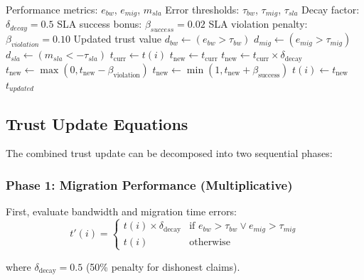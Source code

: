 \documentclass[12pt,a4paper]{article}
\begin{document}
\begin{algorithm}[H]
\caption{Combined Trust Evaluation}
\begin{algorithmic}[1]
\Require Performance metrics: $e_{bw}$, $e_{mig}$, $m_{sla}$
\Require Error thresholds: $\tau_{bw}$, $\tau_{mig}$, $\tau_{sla}$
\Require Decay factor: $\delta_{decay} = 0.5$
\Require SLA success bonus: $\beta_{success} = 0.02$
\Require SLA violation penalty: $\beta_{violation} = 0.10$
\Ensure Updated trust value
\State $d_{bw} \gets (e_{bw} > \tau_{bw})$
\State $d_{mig} \gets (e_{mig} > \tau_{mig})$
\State $d_{sla} \gets (m_{sla} < -\tau_{sla})$
\State $t_{\text{curr}} \gets t(i)$
\State $t_{\text{new}} \gets t_{\text{curr}}$
\State
{} 
    \State $t_{\text{new}} \gets t_{\text{curr}} \times \delta_{\text{decay}}$
\EndIf
\State
{} 
    \State $t_{\text{new}} \gets \max(0, t_{\text{new}} - \beta_{\text{violation}})$
 
    \State $t_{\text{new}} \gets \min(1, t_{\text{new}} + \beta_{\text{success}})$
\EndIf
\State
\State $t(i) \gets t_{\text{new}}$
\State \Return $t_{updated}$
\end{algorithmic}
\end{algorithm}

\subsection{Trust Update Equations}

The combined trust update can be decomposed into two sequential phases:

\subsubsection{Phase 1: Migration Performance (Multiplicative)}

First, evaluate bandwidth and migration time errors:
\begin{equation}
    t'(i) = \begin{cases}
        t(i) \times \delta_{\text{decay}} & \text{if } e_{bw} > \tau_{bw} \lor e_{mig} > \tau_{mig} \\
        t(i) & \text{otherwise}
    \end{cases}
\end{equation}

where $\delta_{\text{decay}} = 0.5$ (50\% penalty for dishonest claims).
\end{document}
